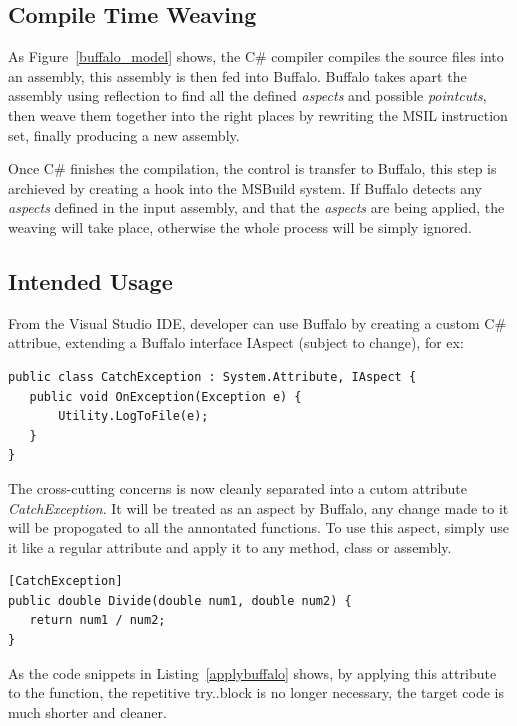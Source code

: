 \subsection{Compile Time Weaving}
As Figure~\ref{buffalo_model} shows, the C\# compiler compiles the source files into an assembly, this assembly is then fed into Buffalo. Buffalo takes apart the assembly using reflection to find all the defined {\em aspects} and possible {\em pointcuts}, then weave them together into the right places by rewriting the MSIL instruction set, finally producing a new assembly.

Once C\# finishes the compilation, the control is transfer to Buffalo, this step is archieved by creating a hook into the MSBuild system. If Buffalo detects any {\em aspects} defined in the input assembly, and that the {\em aspects} are being applied, the weaving will take place, otherwise the whole process will be simply ignored.

\subsection{Intended Usage}
From the Visual Studio IDE, developer can use Buffalo by creating a custom C\# attribue, extending a Buffalo interface IAspect (subject to change), for ex:

\begin{lstlisting}[caption={Buffalo aspect}, label=buffalocode]
public class CatchException : System.Attribute, IAspect {
   public void OnException(Exception e) {
       Utility.LogToFile(e);
   } 
}
\end{lstlisting}

The cross-cutting concerns is now cleanly separated into a cutom attribute {\em CatchException}. It will be treated as an aspect by Buffalo, any change made to it will be propogated to all the annontated functions. To use this aspect, simply use it like a regular attribute and apply it to any method, class or assembly.

\begin{lstlisting}[caption={applying Buffalo aspect}, label=applybuffalo]
[CatchException]
public double Divide(double num1, double num2) {
   return num1 / num2;
}
\end{lstlisting}

As the code snippets in Listing~\ref{applybuffalo} shows, by applying this attribute to the function, the repetitive try..block is no longer necessary, the target code is much shorter and cleaner. 

